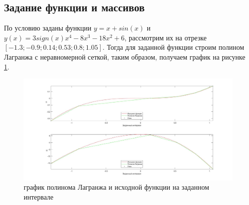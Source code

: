 \documentclass[a4paper]{article}
\begin{document}
\subsection{Задание функции и массивов} 
По условию заданы функции $ y = x+sin(x)$ и $ y(x) = 3sign(x)x^{4}-8x^{3}-18x^{2}+6$, рассмотрим их на отрезке $[-1.3;-0.9;0.14;0.53;0.8;1.05]$. Тогда для заданной функции строим полином Лагранжа с неравномерной сеткой, таким образом, получаем график на рисунке \ref{Рис3}.
\begin{figure}[h!]
\begin{center}
\includegraphics[scale=0.3]{функции.jpg} 
\end{center}
\caption{график полинома Лагранжа и исходной функции на заданном интервале} \label{Рис3}
\end{figure}\\

\newpage
\end{document}
